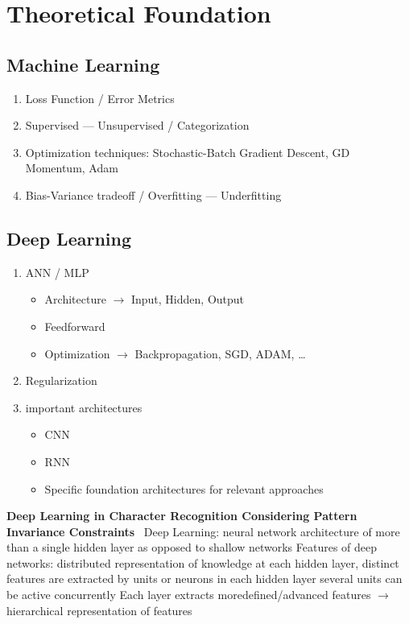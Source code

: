 \chapter{Theoretical Foundation}

\section{Machine Learning}

\begin{enumerate}
    \item Loss Function / Error Metrics
    \item Supervised --- Unsupervised / Categorization
    \item Optimization techniques: Stochastic-Batch Gradient Descent, GD Momentum, Adam
    \item Bias-Variance tradeoff / Overfitting --- Underfitting
\end{enumerate}

\section{Deep Learning}
\begin{enumerate}
    \item ANN / MLP %
        \begin{itemize}
            \item Architecture $\rightarrow$ Input, Hidden, Output
            \item Feedforward
            \item Optimization $\rightarrow$ Backpropagation, SGD, ADAM, \ldots
        \end{itemize}
    \item Regularization
    \item important architectures
        \begin{itemize}
            \item CNN %
            \item RNN %
            \item Specific foundation architectures for relevant approaches
        \end{itemize}
\end{enumerate}

\textbf{Deep Learning in Character Recognition Considering Pattern Invariance
Constraints}~\cite{oyedotun_deep_2015}
Deep Learning: neural network architecture of more than a single hidden layer as opposed to shallow networks
Features of deep networks: distributed representation of knowledge at each hidden layer, distinct
features are extracted by units or neurons in each hidden layer
several units can be active concurrently
Each layer extracts moredefined/advanced features $\rightarrow$ hierarchical representation of
features

